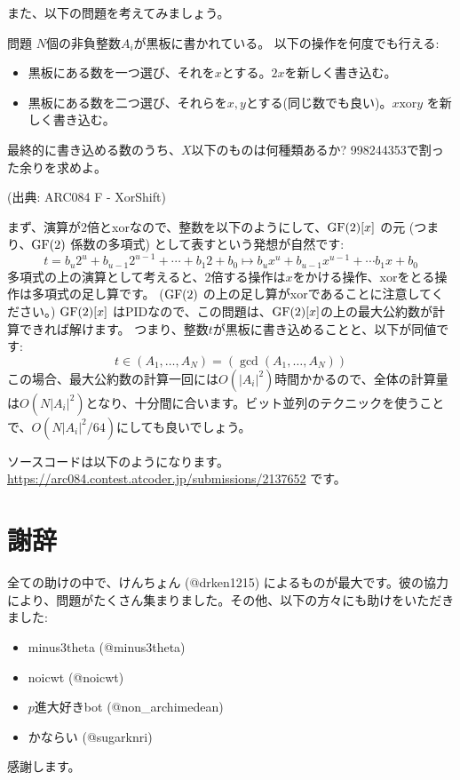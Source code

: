 \documentclass{jsarticle}
\begin{document}
 また、以下の問題を考えてみましょう。
 \begin{itembox}[l]{問題}
  $N$個の非負整数$A_i$が黒板に書かれている。
  以下の操作を何度でも行える:
  \begin{itemize}
   \item 黒板にある数を一つ選び、それを$x$とする。$2x$を新しく書き込む。
   \item 黒板にある数を二つ選び、それらを$x,y$とする(同じ数でも良い)。$x \mathbin{\mathrm{xor}} y$ を新しく書き込む。
  \end{itemize}
  最終的に書き込める数のうち、$X$以下のものは何種類あるか? 998244353で割った余りを求めよ。

  (出典: ARC084 F - XorShift)
 \end{itembox}
 まず、演算が2倍とxorなので、整数を以下のようにして、$\mathrm{GF}(2)[x]$ の元
 (つまり、$\mathrm{GF}(2)$ 係数の多項式) として表すという発想が自然です:
 \begin{displaymath}
  t = b_u 2^u + b_{u-1}2^{u-1} + \cdots + b_1 2 + b_0 \mapsto
  b_u x^u + b_{u-1} x^{u-1} + \cdots b_1 x + b_0
 \end{displaymath}
 多項式の上の演算として考えると、2倍する操作は$x$をかける操作、xorをとる操作は多項式の足し算です。 ($\mathrm{GF}(2)$ の上の足し算がxorであることに注意してください。)
 $\mathrm{GF}(2)[x]$ はPIDなので、この問題は、$\mathrm{GF}(2)[x]$の上の最大公約数が計算できれば解けます。
 つまり、整数$t$が黒板に書き込めることと、以下が同値です:
 \begin{displaymath}
  t \in (A_1, \ldots, A_N) = (\gcd(A_1, \ldots, A_N))
 \end{displaymath}
 この場合、最大公約数の計算一回には$O(|A_i|^2)$時間かかるので、全体の計算量は$O(N|A_i|^2)$となり、十分間に合います。ビット並列のテクニックを使うことで、$O(N|A_i|^2/64)$にしても良いでしょう。

 ソースコードは以下のようになります。\url{https://arc084.contest.atcoder.jp/submissions/2137652} です。
 
\printindex
 \section*{謝辞}
 \label{sec:acknowledgements}
 全ての助けの中で、けんちょん (@drken1215) によるものが最大です。彼の協力により、問題がたくさん集まりました。その他、以下の方々にも助けをいただきました:
 \begin{itemize}
  \item minus3theta (@minus3theta)
  \item noicwt (@noicwt)
  \item $p$進大好きbot (@non\_archimedean)
  \item かならい (@sugarknri)
 \end{itemize}
 感謝します。
\end{document}
